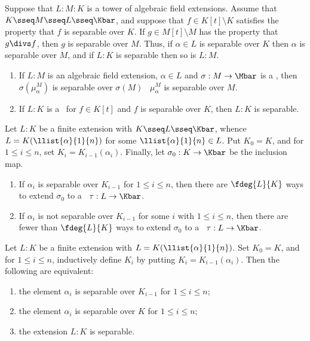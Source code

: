 \documentclass{article}
\begin{document}
\begin{tlemma}
  Suppose that \( L:M:K \) is a tower of algebraic field extensions.
  Assume that \( K\sseq M\sseq L\sseq \Kbar \), and suppose that \( f\in K[t]\setminus K \) satisfies the property that \( f \) is separable over \( K \).
  If \( g\in M[t]\setminus M \) has the property that \( g\divs f \), then \( g \) is separable over \( M \).
  Thus, if \( \alpha\in L \) is separable over \( K \) then \( \alpha \) is separable over \( M \), and if \( L:K \) is separable then so is \( L:M \).
\end{tlemma}

\begin{tlemma}
  \begin{enumerate}
    \item If \( L:M \) is an algebraic field extension, \( \alpha\in L \) and \( \sigma:M\to\Mbar \) is a \homo, then \( \sigma(\mu_\alpha^M) \) is separable over \( \sigma(M) \) \iff~\( \mu_\alpha^M  \) is separable over \( M \).
    \item If \( L:K \) is a \sfe~for \( f\in K[t] \) and \( f \) is separable over \( K \), then \( L:K \) is separable.
  \end{enumerate}
\end{tlemma}

\begin{ttheorem}
  Let \( L:K \) be a finite extension with \( K\sseq L\sseq \Kbar \), whence \( L=K(\llist{\alpha}{1}{n}) \) for some \( \llist{\alpha}{1}{n}\in L \).
  Put \( K_0=K \), and for \( 1\leq i\leq n \), set \( K_i=K_{i-1}(\alpha_i) \).
  Finally, let \( \sigma_0:K\to\Kbar \) be the inclusion map. \begin{enumerate}[label=(\roman*)]
    \item If \( \alpha_i \) is separable over \( K_{i-1} \) for \( 1\leq i\leq n \), then there are \( \fdeg{L}{K} \) ways to extend \( \sigma_0 \) to a \homo~\( \tau:L\to \Kbar \).
    \item If \( \alpha_i \) is not separable over \( K_{i-1} \) for some \( i \) with \( 1\leq i\leq n \), then there are fewer than \( \fdeg{L}{K} \) ways to extend \( \sigma_0 \) to a \homo~\( \tau:L\to \Kbar \).
  \end{enumerate}
\end{ttheorem}

\begin{ttheorem}
  Let \( L:K \) be a finite extension with \( L=K(\llist{\alpha}{1}{n}) \).
  Set \( K_0=K \), and for \( 1\leq i\leq n \), inductively define \( K_i \) by putting \( K_i=K_{i-1}(\alpha_i) \).
  Then the following are equivalent: \begin{enumerate}[label=(\roman*)]
    \item the element \( \alpha_i \) is separable over \( K_{i-1} \) for \( 1\leq i\leq n \);
    \item the element \( \alpha_i \) is separable over \( K \) for \( 1\leq i\leq n \);
    \item the extension \( L:K \) is separable.
  \end{enumerate}
\end{ttheorem}
\end{document}

